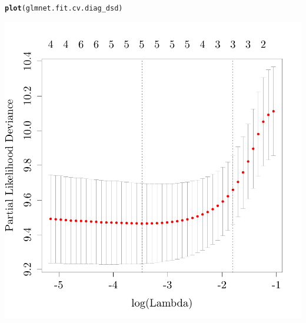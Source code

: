 \documentclass{article}\usepackage[]{graphicx}\usepackage[]{color}
\makeatletter
\def\maxwidth{ %
  \ifdim\Gin@nat@width>\linewidth
    \linewidth
  \else
    \Gin@nat@width
  \fi
}
\newcommand{\hlstd}[1]{\textcolor[rgb]{0.345,0.345,0.345}{#1}}%
\newcommand{\hlkwd}[1]{\textcolor[rgb]{0.737,0.353,0.396}{\textbf{#1}}}%
\newenvironment{kframe}{%
 \def\at@end@of@kframe{}%
 \ifinner\ifhmode%
  \def\at@end@of@kframe{\end{minipage}}%
  \begin{minipage}{\columnwidth}%
 \fi\fi%
 \def\FrameCommand##1{\hskip\@totalleftmargin \hskip-\fboxsep
 \colorbox{shadecolor}{##1}\hskip-\fboxsep
     \hskip-\linewidth \hskip-\@totalleftmargin \hskip\columnwidth}%
 \MakeFramed {\advance\hsize-\width
   \@totalleftmargin\z@ \linewidth\hsize
   \@setminipage}}%
 {\par\unskip\endMakeFramed%
 \at@end@of@kframe}
\newenvironment{knitrout}{}{} %
\makeatother
\begin{document}
\begin{knitrout}
\color{fgcolor}\begin{kframe}
\begin{alltt}
\hlkwd{plot}\hlstd{(glmnet.fit.cv.diag_dsd)}
\end{alltt}
\end{kframe}

{\centering \includegraphics[width=\maxwidth]{figure/nmf-metagene-glmnet-plots-1} 

}



\end{knitrout}
\end{document}
